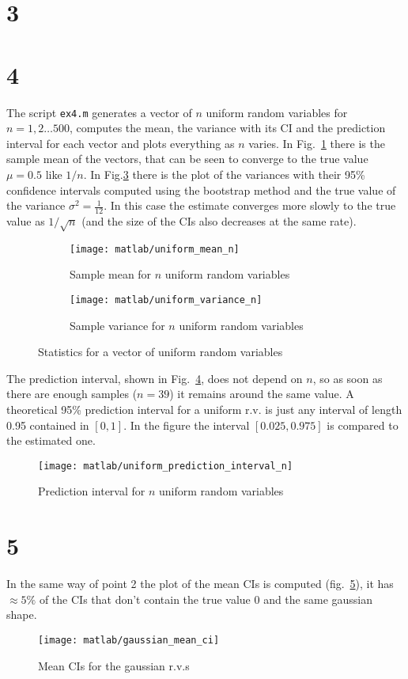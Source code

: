 \documentclass{article}
\newcommand{\inlinecode}[1]{\lstinline[basicstyle=\ttfamily,keywordstyle={}]{#1}}
\begin{document}
\section*{3}
\section*{4}
The script \inlinecode{ex4.m} generates a vector of $n$ uniform random
variables for $n = 1,2\dots500$, computes the mean, the variance with
its CI and the prediction interval for each vector and plots
everything as $n$ varies. In Fig.~\ref{uniform_mean} there is the
sample mean of the vectors, that can be seen to converge to the true
value $\mu=0.5$ like $1/n$. In Fig.\ref{uniform_var} there is the plot
of the variances with their 95\% confidence intervals computed using
the bootstrap method and the true value of the variance $\sigma^2 =
\frac{1}{12}$. In this case the estimate converges more slowly to the
true value as $1/\sqrt{n}$ (and the size of the CIs also decreases at
the same rate).
\begin{figure}[htbp]
  \centering
  \begin{subfigure}{.5\textwidth}
    \centering
    \texttt{[image: matlab/uniform\_mean\_n]}
    \caption{Sample mean for $n$ uniform random variables}
    \label{uniform_mean}
    \end{subfigure}%
  \begin{subfigure}{.5\textwidth}
    \centering
    \texttt{[image: matlab/uniform\_variance\_n]}
    \caption{Sample variance for $n$ uniform random variables}
    \label{uniform_var}
  \end{subfigure}
  \caption{Statistics for a vector of uniform random variables}
\end{figure}
The prediction interval, shown in Fig.~\ref{pred_int_unif}, does not
depend on $n$, so as soon as there are enough samples ($n=39$) it
remains around the same value. A theoretical 95\% prediction interval
for a uniform r.v. is just any interval of length 0.95 contained in
$[0,1]$. In the figure the interval $[0.025, 0.975]$ is compared to
the estimated one.
\begin{figure}[htbp]
  \centering
  \texttt{[image: matlab/uniform\_prediction\_interval\_n]}
  \caption{Prediction interval for $n$ uniform random variables}
  \label{pred_int_unif}
\end{figure}
\section*{5} In the same way of point 2 the plot of the mean CIs is computed
(fig.~\ref{gaussian_mean_ci}), it has $\approx 5\%$ of the CIs that
don't contain the true value 0 and the same gaussian shape.
\begin{figure}[htbp]
  \centering
  \texttt{[image: matlab/gaussian\_mean\_ci]}
  \caption{Mean CIs for the gaussian r.v.s}
  \label{gaussian_mean_ci}
\end{figure}
\end{document}
